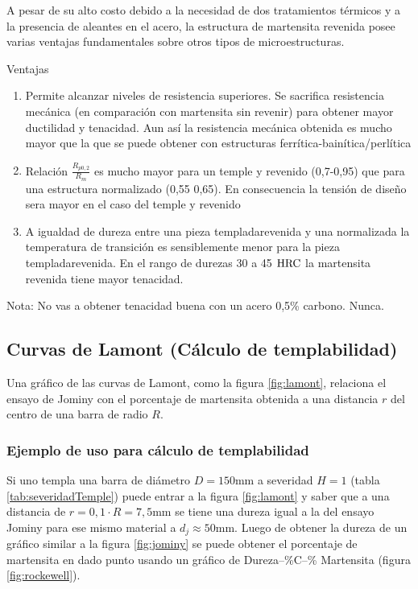 A pesar de su alto costo debido a la necesidad de dos tratamientos térmicos y a la presencia de aleantes en el acero, la estructura de martensita revenida posee varias ventajas fundamentales sobre otros tipos de microestructuras.


Ventajas
\begin{enumerate}
    \item Permite alcanzar niveles de resistencia superiores. Se sacrifica resistencia mecánica (en comparaci\'on con martensita sin revenir) para obtener mayor ductilidad y tenacidad. Aun así la resistencia mecánica obtenida es mucho mayor que la que se puede obtener con estructuras ferrítica-bainítica/perlítica
    \item Relación $\frac{R_{p0,2}}{R_m}$ es mucho mayor para un temple y revenido (0,7-0,95) que para una estructura normalizado (0,55 0,65). En consecuencia la tensión de diseño sera mayor en el caso del temple y revenido
    \item A igualdad de dureza entre una pieza templada\goright{}revenida y una normalizada la temperatura de transición es sensiblemente menor para la pieza templada\goright{}revenida. En el rango de durezas 30 a 45 $\mathrm{HRC}$ la martensita revenida tiene mayor tenacidad.
\end{enumerate}
Nota: No vas a obtener tenacidad buena con un acero 0,5\% carbono. Nunca.

\subsection{Curvas de Lamont (Cálculo de templabilidad)}
Una gráfico de las curvas de Lamont, como la figura \ref{fig:lamont}, relaciona el ensayo de Jominy con el porcentaje de martensita obtenida a una distancia $r$ del centro de una barra de radio $R$. 

\subsubsection{Ejemplo de uso para cálculo de templabilidad}
 Si uno templa una barra de diámetro $D=150$mm a severidad $H=1$ (tabla \ref{tab:severidadTemple}) puede entrar a la figura \ref{fig:lamont} y saber que a una distancia de $r=0,1\cdot R=7,5$mm se tiene una dureza igual a la del ensayo Jominy para ese mismo material a $d_j\approx50$mm. Luego de obtener la dureza \HRC{} de un gráfico similar a la figura \ref{fig:jominy} se puede obtener el porcentaje de martensita en dado punto usando un gráfico de Dureza--\%C--\% Martensita (figura \ref{fig:rockewell}).
 
